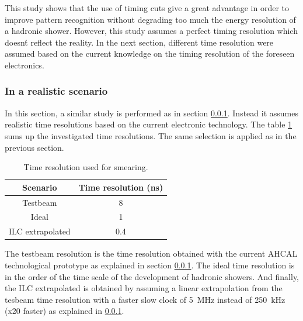 This study shows that the use of timing cuts give a great advantage in order to improve pattern recognition without degrading too much the energy resolution of a hadronic shower. However, this study assumes a perfect timing resolution which doesn\'t reflect the reality. In the next section, different time resolution were assumed based on the current knowledge on the timing resolution of the foreseen electronics.

\subsubsection{In a realistic scenario}

In this section, a similar study is performed as in section \ref{}. Instead it assumes realistic time resolutions based on the current electronic technology. The table \ref{table:TimeReso} sums up the investigated time resolutions. The same selection is applied as in the previous section.

\begin{table}[htb!]
  \centering
  \caption{Time resolution used for smearing.} \label{table:TimeReso}
  \begin{tabular}{|c|c|}
    \hline
    Scenario & Time resolution (ns) \\
    \hline
    Testbeam & 8 \\
    Ideal & 1 \\
    ILC extrapolated & 0.4 \\
    \hline
  \end{tabular}
\end{table}

The testbeam resolution is the time resolution obtained with the current AHCAL technological prototype as explained in section \ref{}. The ideal time resolution is in the order of the time scale of the development of hadronic showers. And finally, the ILC extrapolated is obtained by assuming a linear extrapolation from the tesbeam time resolution with a faster slow clock of \SI{5}{\mega\hertz} instead of \SI{250}{\kilo\hertz} (x20 faster) as explained in \ref{}.\\

